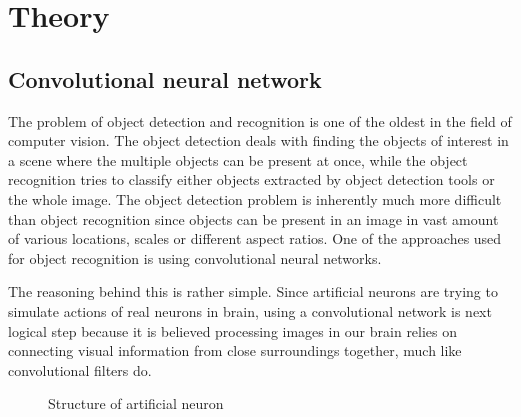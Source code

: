 \section{Theory}

\subsection{Convolutional neural network}
\def\nsep{2.5cm}

The problem of object detection and recognition is one of the oldest in the field of computer vision. The object detection deals with finding the objects of interest in a scene where the multiple objects can be present at once, while the object recognition tries to classify either objects extracted by object detection tools or the whole image. The object detection problem is inherently much more difficult than object recognition since objects can be present in an image in vast amount of various locations, scales or different aspect ratios. One of the approaches used for object recognition is using convolutional neural networks.

The reasoning behind this is rather simple. Since artificial neurons are trying to simulate actions of real neurons in brain, using a convolutional network is next logical step because it is believed processing images in our brain relies on connecting visual information from close surroundings together, much like convolutional filters do.

\begin{figure}
\caption{Structure of artificial neuron}
\label{aneuron}
\end{figure}

